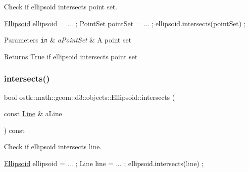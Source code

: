 Check if ellipsoid intersects point set. 


\begin{DoxyCode}
\hyperlink{classostk_1_1math_1_1geom_1_1d3_1_1objects_1_1_ellipsoid_acd84276f65a14db12623402a411712b7}{Ellipsoid} ellipsoid = ... ;
PointSet pointSet = ... ;
ellipsoid.intersects(pointSet) ;
\end{DoxyCode}



\begin{DoxyParams}[1]{Parameters}
\mbox{\tt in}  & {\em a\+Point\+Set} & A point set \\
\hline
\end{DoxyParams}
\begin{DoxyReturn}{Returns}
True if ellipsoid intersects point set 
\end{DoxyReturn}
\mbox{\label{classostk_1_1math_1_1geom_1_1d3_1_1objects_1_1_ellipsoid_ade6288d324e3227eafd0126fc4680471}} 
\subsubsection{\texorpdfstring{intersects()}{intersects()}\hspace{0.1cm}{\footnotesize\ttfamily [3/10]}}
{\footnotesize\ttfamily bool ostk\+::math\+::geom\+::d3\+::objects\+::\+Ellipsoid\+::intersects (\begin{DoxyParamCaption}\item[{const \hyperlink{classostk_1_1math_1_1geom_1_1d3_1_1objects_1_1_line}{Line} \&}]{a\+Line }\end{DoxyParamCaption}) const}



Check if ellipsoid intersects line. 


\begin{DoxyCode}
\hyperlink{classostk_1_1math_1_1geom_1_1d3_1_1objects_1_1_ellipsoid_acd84276f65a14db12623402a411712b7}{Ellipsoid} ellipsoid = ... ;
Line line = ... ;
ellipsoid.intersects(line) ;
\end{DoxyCode}



